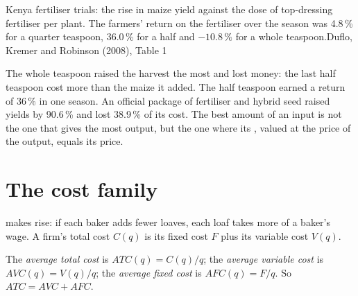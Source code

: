 \begin{omchart}{Kenya fertiliser trials: the rise in maize yield against the dose of top-dressing fertiliser per plant. The farmers' return on the fertiliser over
the season was 4.8\,\% for a quarter teaspoon, 36.0\,\% for a half and $-10.8\,\%$ for a whole teaspoon.}{Duflo, Kremer and Robinson (2008), Table 1}
\end{omchart}

The whole teaspoon raised the harvest the most and lost money: the last half teaspoon cost more than the maize it added. The half teaspoon earned a return of
36\,\% in one season. An official package of fertiliser and hybrid seed raised yields by 90.6\,\% and lost 38.9\,\% of its cost. The best amount of an input is not
the one that gives the most output, but the one where its , valued at the price of the output, equals its price.

\section{The cost family}\label{sec:g11:production-and-costs:costs}

 makes  rise: if each baker adds fewer loaves, each loaf takes more of a baker's wage. A firm's total cost $C(q)$
is its fixed cost $F$ plus its variable cost $V(q)$.

\begin{definition}\label{def:g11:production-and-costs:atc}
The \emph{average total cost} is $\mathit{ATC}(q) = C(q)/q$; the \emph{average variable cost}%
\label{def:g11:production-and-costs:avc} is $\mathit{AVC}(q) = V(q)/q$; the \emph{average fixed cost}%
\label{def:g11:production-and-costs:afc} is $\mathit{AFC}(q) = F/q$. So $\mathit{ATC} = \mathit{AVC} + \mathit{AFC}$.
\end{definition}

